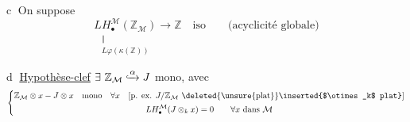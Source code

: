 \textcircled{c} On suppose
\[
\underset{\begin{smallmatrix}\Vert\\L\varphi(\kappa(\mathbb Z))\end{smallmatrix}}
{LH_\bullet^{\mathcal M}(\mathbb Z_{\mathcal M})}\longrightarrow\mathbb Z\quad\text{iso}
\qquad\text{(acyclicité globale)}
\]

\textcircled{d} \uline{Hypothèse-clef}
$\exists\ \mathbb Z_{\mathcal M}\lhook\joinrel\xrightarrow{\alpha}J$ mono, avec
\[
\left\{\begin{gathered}
\mathbb Z_{\mathcal M}\otimes x\mathbin{-}J\otimes x\quad\text{mono}\quad\forall x
\quad[\text{p. ex. }J/\mathbb Z_{\mathcal M}\ \text{\deleted{\unsure{plat}}\inserted{$\otimes_k$ plat}}]\\
LH_\bullet^{\mathcal M}(J\otimes_kx)=0\qquad\forall x\text{ dans }\mathcal M
\end{gathered}\right.
\]

